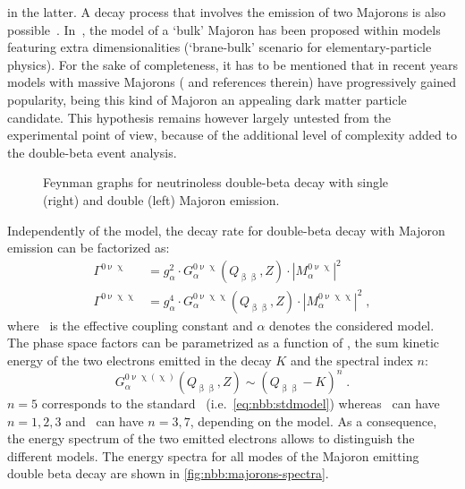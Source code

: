 in the latter. A decay process that involves the emission of two Majorons is
also possible~\cite{Bamert1995}.  In~\cite{Mohpatra2000}, the model of a `bulk'
Majoron has been proposed within models featuring extra dimensionalities
(`brane-bulk' scenario for elementary-particle physics).
\newpar
For the sake of completeness, it has to be mentioned that in recent years
models with massive Majorons (\cite{Blum2018} and references therein) have
progressively gained popularity, being this kind of Majoron an appealing dark
matter particle candidate. This hypothesis remains however largely untested
from the experimental point of view, because of the additional level of
complexity added to the double-beta event analysis.

\begin{figure}
  \centering%
  \caption{%
    Feynman graphs for neutrinoless double-beta decay with single (right) and double
    (left) Majoron emission.
  }\label{fig:nbb:majfeydiag}
\end{figure}

Independently of the model, the decay rate for double-beta decay with Majoron emission can
be factorized as:
\begin{align*}
  \Gamma^{0\upnu\upchi}  &= g_\alpha^2 \cdot G_\alpha^{0\upnu\upchi}(Q_{\upbeta\upbeta}, Z)
    \cdot |M_\alpha^{0\upnu\upchi}|^2 \\
  \Gamma^{0\upnu\upchi\upchi} &= g_\alpha^4 \cdot G_\alpha^{0\upnu\upchi\upchi}(Q_{\upbeta\upbeta}, Z)
    \cdot |M_\alpha^{0\upnu\upchi\upchi}|^2 \;,
\end{align*}
where \ga\ is the effective coupling constant and $\alpha$ denotes the considered
model. The phase space factors can be parametrized as a function of \qbb, the sum kinetic
energy of the two electrons emitted in the decay $K$ and the spectral index $n$:
\[
  G_\alpha^{0\upnu\upchi(\upchi)}(Q_{\upbeta\upbeta}, Z)
    \sim {(Q_{\upbeta\upbeta} - K)}^n \;.
\]
$n = 5$ corresponds to the standard \nnbb\ (i.e.~\cref{eq:nbb:stdmodel}) whereas \onbbx\
can have $n = 1, 2, 3$ and \onbbxx\ can have $n = 3, 7$, depending on the model. As a
consequence, the energy spectrum of the two emitted electrons allows to distinguish the
different models. The energy spectra for all modes of the Majoron emitting double beta
decay are shown in \cref{fig:nbb:majorons-spectra}.

